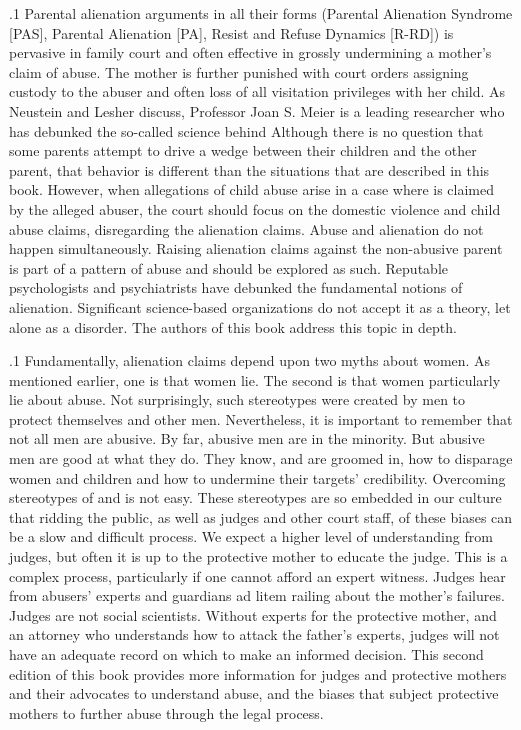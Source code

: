 \documentclass[11pt, twoside]{article}
\begin{document}
{\p.1{%
\raggedbottom{}
Parental alienation arguments in all their forms (Parental Alienation
Syndrome [PAS], Parental Alienation [PA], Resist and Refuse Dynamics
[R-RD]) is pervasive in family court and often effective in grossly undermining a mother's claim of abuse. The mother is further punished with
court orders assigning custody to the abuser and often loss of all visitation privileges with her child. As Neustein and Lesher discuss, Professor
Joan S. Meier is a leading researcher who has debunked the so-called
science behind  Although there is no question that some
parents attempt to drive a wedge between their children and the other
parent, that behavior is different than the situations that are described
in this book. However, when allegations of child abuse arise in a case
where  is claimed by the alleged abuser, the court should focus on the domestic violence and child abuse claims, disregarding the
alienation claims. Abuse and alienation do not happen simultaneously.
Raising alienation claims against the non-abusive parent is part of a pattern of abuse and should be explored as such. Reputable psychologists
and psychiatrists have debunked the fundamental notions of alienation.
Significant science-based organizations do not accept it as a theory,
let alone as a disorder. The authors of this book address this topic in
depth.
} %

\p.1{%
\vspace*{-16pt}
Fundamentally, alienation claims depend upon two myths about wo\-men.
As mentioned earlier, one is that women lie. The second is that
women particularly lie about abuse. Not surprisingly, such stereotypes
were created by men to protect themselves and other men.
Nevertheless, it is important to remember that not all men are abusive. By far, abusive men are in the minority. But abusive men are good
at what they do. They know, and are groomed in, how to disparage
women and children and how to undermine their targets' credibility.
Overcoming stereotypes of   and
 is not easy. These stereotypes are so embedded in our culture that ridding the public, as well as judges and other court staff, of
these biases can be a slow and difficult process. We expect a higher
level of understanding from judges, but often it is up to the protective
mother to educate the judge. This is a complex process, particularly if
one cannot afford an expert witness. Judges hear from abusers' experts
and guardians ad litem railing about the mother's failures. Judges are
not social scientists. Without experts for the protective mother, and an
attorney who understands how to attack the father's experts, judges will
not have an adequate record on which to make an informed decision.
This second edition of this book provides more information for judges
and protective mothers and their advocates to understand abuse, and the
biases that subject protective mothers to further abuse through the legal
process.
} %

}
\end{document}
